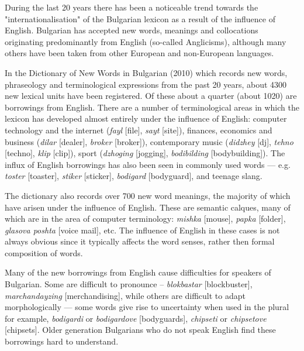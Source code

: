 \begin{multicols}{2}
During the last 20 years there has been a noticeable trend towards the "internationalisation" of the Bulgarian lexicon as a result of the influence of English. Bulgarian has accepted new words, meanings and collocations originating predominantly from English (so-called Anglicisms), although many others have been taken from other European and non-European languages.

In the Dictionary of New Words in Bulgarian (2010)  \cite{NWDict} which records new words, phraseology and terminological expressions from the past 20 years, about 4300 new lexical units have been registered. Of these about a quarter (about 1020) are borrowings from English. There are a number of terminological areas in which the lexicon has developed almost entirely under the influence of English: computer technology and the internet (\textit{{fayl}} [file], \textit{{sayt}} [site]), finances, economics and business (\textit{{dilar}} [dealer], \textit{{broker}} [broker]), contemporary music (\textit{{didzhey}} [dj], \textit{{tehno}} [techno], \textit{{klip}} [clip]), sport (\textit{{dzhoging}} [jogging], \textit{{bodibilding}} [bodybuilding]). The influx of English borrowings has also been seen in commonly used words — e.g. \textit{{toster}} [toaster], \textit{{stiker}} [sticker], \textit{{bodigard}} [bodyguard], and teenage slang.

The dictionary also records over 700 new word meanings, the majority of which have arisen under the influence of English. These are semantic calques, many of which are in the area of computer terminology: \textit{{mishka}} [mouse], \textit{{papka}} [folder], \textit{{glasova poshta}} [voice mail], etc. The influence of English in these cases is not always obvious since it typically affects the word senses, rather then formal composition of words. 

Many of the new borrowings from English cause difficulties for speakers of Bulgarian. Some are difficult to pronounce – \textit{{blokbastar}} [blockbuster], \textit{{marchandayzing}} [merchandising], while others are difficult to adapt morphologically — some words give rise to uncertainty when used in the plural for example, \textit{{bodigardi}} or \textit{{bodigardove}} [bodyguards], \textit{{chipseti}} or \textit{{chipsetove}} [chipsets]. Older generation Bulgarians who do not speak English find these borrowings hard to understand. 


\end{multicols}
